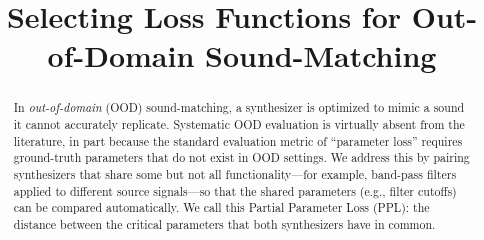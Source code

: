 \documentclass[10pt]{article} %
\title{Selecting Loss Functions for Out-of-Domain Sound-Matching}
\begin{document}
\address{University of Alberta}

\maketitle



\begin{abstract}



In \textit{out-of-domain} (OOD) sound-matching, a synthesizer is optimized to mimic a sound it cannot accurately replicate. Systematic OOD evaluation is virtually absent from the literature, in part because the standard evaluation metric of ``parameter loss'' requires ground-truth parameters that do not exist in OOD settings. We address this by pairing synthesizers that share some but not all functionality---for example, band-pass filters applied to different source signals---so that the shared parameters (e.g., filter cutoffs) can be compared automatically. We call this Partial Parameter Loss (PPL): the distance between the critical parameters that both synthesizers have in common.


\end{abstract}
\end{document}
